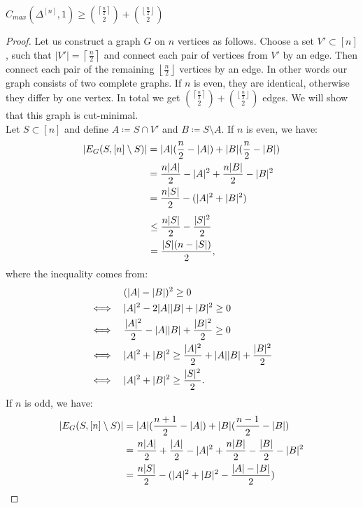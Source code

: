 \begin{prop}\label{proposition3}
\(C_{max}(\Delta^{[n]},1)\geq\binom{\left\lceil\frac{n}{2}\right\rceil}{2}+\binom{\left\lfloor\frac{n}{2}\right\rfloor}{2}\)
\begin{proof}
Let us construct a graph \(G\) on \(n\) vertices as follows. Choose a set \(V'\subset [n]\), such that \(|V'|=\left\lceil\frac{n}{2}\right\rceil\) and connect each pair of vertices from \(V'\) by an edge. Then connect each pair of the remaining \(\left\lfloor\frac{n}{2}\right\rfloor\) vertices by an edge. In other words our graph consists of two complete graphs. If \(n\) is even, they are identical, otherwise they differ by one vertex. In total we get \(\binom{\left\lceil\frac{n}{2}\right\rceil}{2}+\binom{\left\lfloor\frac{n}{2}\right\rfloor}{2}\) edges. We will show that this graph is cut-minimal.\\
Let \(S\subset [n]\) and define \(A\coloneqq S\cap V'\) and \(B\coloneqq S\setminus A\). If \(n\) is even, we have:
\begin{align}
|E_G(S,[n]\setminus S)|&=|A|(\frac{n}{2}-|A|)+|B|(\frac{n}{2}-|B|)\notag\\
&=\frac{n|A|}{2}-|A|^2+\frac{n|B|}{2}-|B|^2\notag\\
&=\frac{n|S|}{2}-(|A|^2+|B|^2)\notag
\end{align}
\begin{align}
&\leq\frac{n|S|}{2}-\frac{|S|^2}{2}\notag\\
&=\frac{|S|(n-|S|)}{2},\notag
\end{align}
where the inequality comes from:
\begin{align}
&\quad\quad\quad\:\, (|A|-|B|)^2\geq 0\notag\\
&\Longleftrightarrow\quad |A|^2-2|A||B|+|B|^2\geq 0\notag\\
&\Longleftrightarrow\quad \frac{|A|^2}{2}-|A||B|+\frac{|B|^2}{2}\geq 0\notag\\
&\Longleftrightarrow\quad |A|^2+|B|^2\geq\frac{|A|^2}{2}+|A||B|+\frac{|B|^2}{2}\notag\\
&\Longleftrightarrow\quad |A|^2+|B|^2\geq\frac{|S|^2}{2}.\notag
\end{align}
If \(n\) is odd, we have:
\begin{align}
|E_G(S,[n]\setminus S)|&=|A|(\frac{n+1}{2}-|A|)+|B|(\frac{n-1}{2}-|B|)\notag\\
&=\frac{n|A|}{2}+\frac{|A|}{2}-|A|^2+\frac{n|B|}{2}-\frac{|B|}{2}-|B|^2\notag\\
&=\frac{n|S|}{2}-(|A|^2+|B|^2-\frac{|A|-|B|}{2})\notag\\

\end{align}
\end{proof}
\end{prop}
